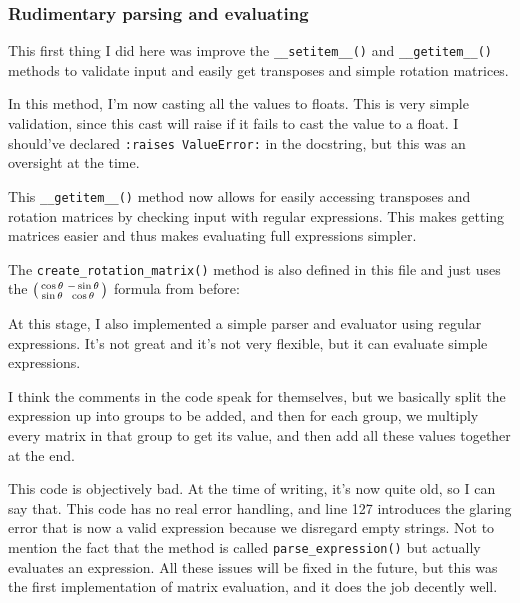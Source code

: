 \documentclass[../development.tex]{subfiles}
\begin{document}
\subsubsection{Rudimentary parsing and evaluating\label{development:matrices-backend:rudimentary-parsing-and-evaluating}}

This first thing I did here was improve the \texttt{\_\_setitem\_\_()} and \texttt{\_\_getitem\_\_()} methods to validate input and easily get transposes and simple rotation matrices.


In this method, I'm now casting all the values to floats. This is very simple validation, since this cast will raise  if it fails to cast the value to a float. I should've declared \texttt{:raises ValueError:} in the docstring, but this was an oversight at the time.


This \texttt{\_\_getitem\_\_()} method now allows for easily accessing transposes and rotation matrices by checking input with regular expressions. This makes getting matrices easier and thus makes evaluating full expressions simpler.

The \texttt{create\_rotation\_matrix()} method is also defined in this file and just uses the $\begin{psmallmatrix}\cos\theta & -\sin\theta\\\sin\theta & \cos\theta\end{psmallmatrix}$ formula from before:


At this stage, I also implemented a simple parser and evaluator using regular expressions. It's not great and it's not very flexible, but it can evaluate simple expressions.


I think the comments in the code speak for themselves, but we basically split the expression up into groups to be added, and then for each group, we multiply every matrix in that group to get its value, and then add all these values together at the end.

This code is objectively bad. At the time of writing, it's now quite old, so I can say that. This code has no real error handling, and line 127 introduces the glaring error that  is now a valid expression because we disregard empty strings. Not to mention the fact that the method is called \texttt{parse\_expression()} but actually evaluates an expression. All these issues will be fixed in the future, but this was the first implementation of matrix evaluation, and it does the job decently well.
\end{document}
